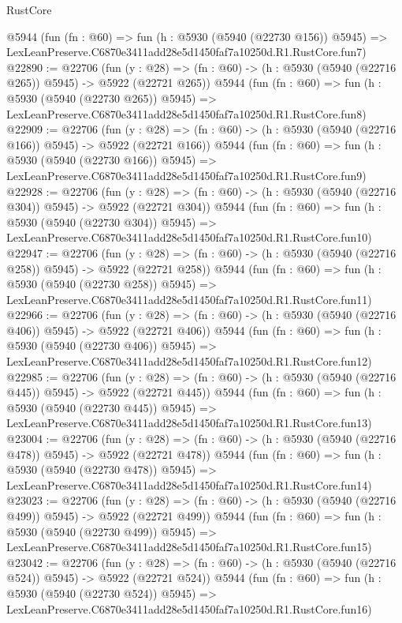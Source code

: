 \begin{lexlean}{RustCore}
\begin{coremodule}
    @5944
    (fun (fn : @60) =>
    fun (h : @5930 (@5940 (@22730 @156)) @5945) =>
    LexLeanPreserve.C6870e3411add28e5d1450faf7a10250d.R1.RustCore.fun7)
@22890 := @22706
    (fun (y : @28) => (fn : @60) -> (h : @5930 (@5940 (@22716 @265)) @5945) -> @5922 (@22721 @265))
    @5944
    (fun (fn : @60) =>
    fun (h : @5930 (@5940 (@22730 @265)) @5945) =>
    LexLeanPreserve.C6870e3411add28e5d1450faf7a10250d.R1.RustCore.fun8)
@22909 := @22706
    (fun (y : @28) => (fn : @60) -> (h : @5930 (@5940 (@22716 @166)) @5945) -> @5922 (@22721 @166))
    @5944
    (fun (fn : @60) =>
    fun (h : @5930 (@5940 (@22730 @166)) @5945) =>
    LexLeanPreserve.C6870e3411add28e5d1450faf7a10250d.R1.RustCore.fun9)
@22928 := @22706
    (fun (y : @28) => (fn : @60) -> (h : @5930 (@5940 (@22716 @304)) @5945) -> @5922 (@22721 @304))
    @5944
    (fun (fn : @60) =>
    fun (h : @5930 (@5940 (@22730 @304)) @5945) =>
    LexLeanPreserve.C6870e3411add28e5d1450faf7a10250d.R1.RustCore.fun10)
@22947 := @22706
    (fun (y : @28) => (fn : @60) -> (h : @5930 (@5940 (@22716 @258)) @5945) -> @5922 (@22721 @258))
    @5944
    (fun (fn : @60) =>
    fun (h : @5930 (@5940 (@22730 @258)) @5945) =>
    LexLeanPreserve.C6870e3411add28e5d1450faf7a10250d.R1.RustCore.fun11)
@22966 := @22706
    (fun (y : @28) => (fn : @60) -> (h : @5930 (@5940 (@22716 @406)) @5945) -> @5922 (@22721 @406))
    @5944
    (fun (fn : @60) =>
    fun (h : @5930 (@5940 (@22730 @406)) @5945) =>
    LexLeanPreserve.C6870e3411add28e5d1450faf7a10250d.R1.RustCore.fun12)
@22985 := @22706
    (fun (y : @28) => (fn : @60) -> (h : @5930 (@5940 (@22716 @445)) @5945) -> @5922 (@22721 @445))
    @5944
    (fun (fn : @60) =>
    fun (h : @5930 (@5940 (@22730 @445)) @5945) =>
    LexLeanPreserve.C6870e3411add28e5d1450faf7a10250d.R1.RustCore.fun13)
@23004 := @22706
    (fun (y : @28) => (fn : @60) -> (h : @5930 (@5940 (@22716 @478)) @5945) -> @5922 (@22721 @478))
    @5944
    (fun (fn : @60) =>
    fun (h : @5930 (@5940 (@22730 @478)) @5945) =>
    LexLeanPreserve.C6870e3411add28e5d1450faf7a10250d.R1.RustCore.fun14)
@23023 := @22706
    (fun (y : @28) => (fn : @60) -> (h : @5930 (@5940 (@22716 @499)) @5945) -> @5922 (@22721 @499))
    @5944
    (fun (fn : @60) =>
    fun (h : @5930 (@5940 (@22730 @499)) @5945) =>
    LexLeanPreserve.C6870e3411add28e5d1450faf7a10250d.R1.RustCore.fun15)
@23042 := @22706
    (fun (y : @28) => (fn : @60) -> (h : @5930 (@5940 (@22716 @524)) @5945) -> @5922 (@22721 @524))
    @5944
    (fun (fn : @60) =>
    fun (h : @5930 (@5940 (@22730 @524)) @5945) =>
    LexLeanPreserve.C6870e3411add28e5d1450faf7a10250d.R1.RustCore.fun16)

\end{coremodule}
\end{lexlean}
